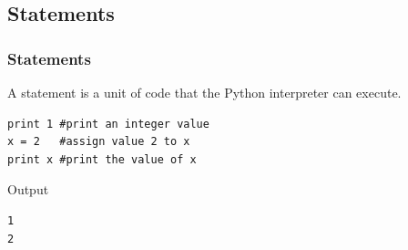 \documentclass{beamer}
\begin{document}
\subsection{Statements}
\begin{frame}[fragile]\frametitle{Statements}
A statement is a unit of code that the Python interpreter can
execute.  
\begin{block}{}
\begin{verbatim}
print 1 #print an integer value
x = 2   #assign value 2 to x
print x #print the value of x
\end{verbatim}
\end{block}
\begin{block}{Output}
\begin{verbatim}
1
2
\end{verbatim}
\end{block}
\end{frame}
\end{document}

